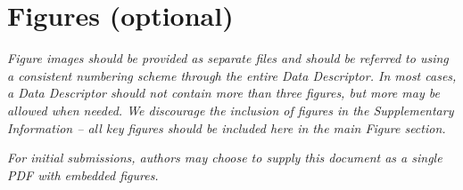 \section{Figures (optional)}

\textit{Figure images should be provided as separate files and should be referred to using a consistent numbering scheme through the entire Data Descriptor.  In most cases, a Data Descriptor should not contain more than three figures, but more may be allowed when needed.  We discourage the inclusion of figures in the Supplementary Information – all key figures should be included here in the main Figure section.  }

\textit{For initial submissions, authors may choose to supply this document as a single PDF with embedded figures.  }
